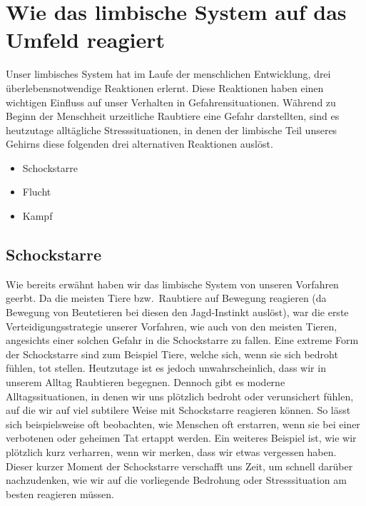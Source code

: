 \section{Wie das limbische System auf das Umfeld reagiert}\label{sec:die-reaktionen-des-limbischen-systems}
Unser limbisches System hat im Laufe der menschlichen Entwicklung, drei überlebensnotwendige Reaktionen erlernt.
Diese Reaktionen haben einen wichtigen Einfluss auf unser Verhalten in Gefahrensituationen.
Während zu Beginn der Menschheit urzeitliche Raubtiere eine Gefahr darstellten, sind es heutzutage alltägliche Stresssituationen, in denen
der limbische Teil unseres Gehirns diese folgenden drei alternativen Reaktionen auslöst.

\begin{itemize}
    \item Schockstarre
    \item Flucht
    \item Kampf
\end{itemize}

\subsection{Schockstarre}\label{subsec:schockstarre}
Wie bereits erwähnt haben wir das limbische System von unseren Vorfahren geerbt.
Da die meisten Tiere bzw.\ Raubtiere auf Bewegung reagieren (da Bewegung von Beutetieren bei diesen den Jagd-Instinkt auslöst),
war die erste Verteidigungsstrategie unserer Vorfahren, wie auch von den meisten Tieren,
angesichts einer solchen Gefahr in die Schockstarre zu fallen.
Eine extreme Form der Schockstarre sind zum Beispiel Tiere, welche sich, wenn sie sich bedroht fühlen, tot stellen.
Heutzutage ist es jedoch unwahrscheinlich, dass wir in unserem Alltag Raubtieren begegnen.
Dennoch gibt es moderne Alltagssituationen, in denen wir uns plötzlich bedroht oder verunsichert fühlen,
auf die wir auf viel subtilere Weise mit Schockstarre reagieren können.
So lässt sich beispielsweise oft beobachten, wie Menschen oft erstarren, wenn sie bei einer
verbotenen oder geheimen Tat ertappt werden.
Ein weiteres Beispiel ist, wie wir plötzlich kurz verharren, wenn wir merken, dass wir etwas vergessen haben.
Dieser kurzer Moment der Schockstarre verschafft uns Zeit, um schnell darüber nachzudenken,
wie wir auf die vorliegende Bedrohung oder Stresssituation am besten reagieren müssen.

